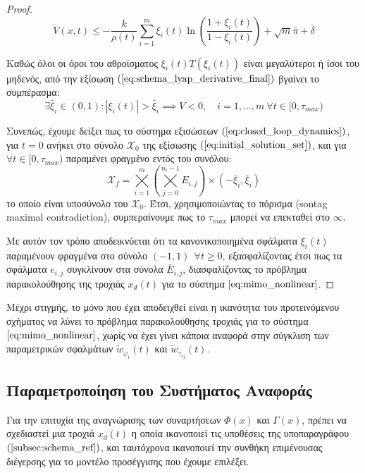 \begin{proof}
\begin{equation*}
	\dot{V}(x,t) \leq  - \frac{k} {\rho(t)} 
	\sum_{i=1}^{m} \xi_i(t) \ln \left( \frac{1 + \xi_i(t)}{1 - \xi_i(t)} \right) 
	+ \sqrt{m} \bar{\pi} + \bar{\delta}
	\label{eq:schema_lyap_derivative_final}
\end{equation*}

Καθώς όλοι οι όροι του αθροίσματος $\xi_i(t) T(\xi_i(t)) $ είναι μεγαλύτεροι ή ίσοι του μηδενός, από την εξίσωση $(\ref{eq:schema_lyap_derivative_final})$ βγαίνει το συμπέρασμα:
\begin{equation*}
	\exists \bar{\xi}_{i} \in (0,1) : | \xi_i(t) | > \bar{\xi}_{i}
	\implies \dot{V} < 0, \quad i = 1,\dots,m  
	\: \forall t \in [0, \tau_{max})
\end{equation*}

Συνεπώς, έχουμε δείξει πως το σύστημα εξισώσεων $(\ref{eq:closed_loop_dynamics})$, για $t = 0$ ανήκει στο σύνολο $\mathcal{X}_0$ της εξίσωσης  $(\ref{eq:initial_solution_set})$, και για $\forall t \in [0, \tau_{max} )$ παραμένει φραγμένο εντός του συνόλου:
\begin{equation*}
	\mathcal{X}_f = \bigtimes\limits_{i=1}^{m} \left( \bigtimes\limits_{j=0}^{n_i-1} E_{i,j} \right) \times (-\bar{\xi}_i ,\bar{\xi}_i)
\end{equation*}
το οποίο είναι υποσύνολο του $\mathcal{X}_0$. Έτσι, χρησιμοποιώντας το πόρισμα (sontag maximal contradiction), συμπεραίνουμε πως το $\tau_{max}$ μπορεί να επεκταθεί στο $\infty$.

Με αυτόν τον τρόπο αποδεικνύεται ότι τα κανονικοποιημένα σφάλματα $\xi_i(t)$ παραμένουν φραγμένα στο σύνολο $(-1,1) \: \: \forall t \geq 0$, εξασφαλίζοντας έτσι πως τα σφάλματα $e_{i,j}$ συγκλίνουν στα σύνολα $\bar{E}_{i,j}$, διασφαλίζοντας το πρόβλημα παρακολούθησης της τροχιάς $x_d(t)$ για το σύστημα $\ref{eq:mimo_nonlinear}$.
\end{proof}

\pagebreak

Μέχρι στιγμής, το μόνο που έχει αποδειχθεί είναι η ικανότητα του προτεινόμενου σχήματος να λύνει το πρόβλημα παρακολούθησης τροχιάς για το σύστημα $\ref{eq:mimo_nonlinear}$, χωρίς να έχει γίνει κάποια αναφορά στην σύγκλιση των παραμετρικών σφαλμάτων $\tilde{w}_{\varphi_i}(t)$ και $\tilde{w}_{\gamma_{ij}}(t)$.

\subsection{Παραμετροποίηση του Συστήματος Αναφοράς}
\label{subsec:schema_ref_parameterization}
Για την επιτυχία της αναγνώρισης των συναρτήσεων $\Phi(x)$ και $\Gamma(x)$, πρέπει να σχεδιαστεί μια τροχιά $x_d(t)$ η οποία ικανοποιεί τις υποθέσεις της υποπαραγράφου $(\ref{subsec:schema_ref})$, και ταυτόχρονα ικανοποιεί την συνθήκη επιμένουσας διέγερσης για το μοντέλο προσέγγισης που έχουμε επιλέξει.

